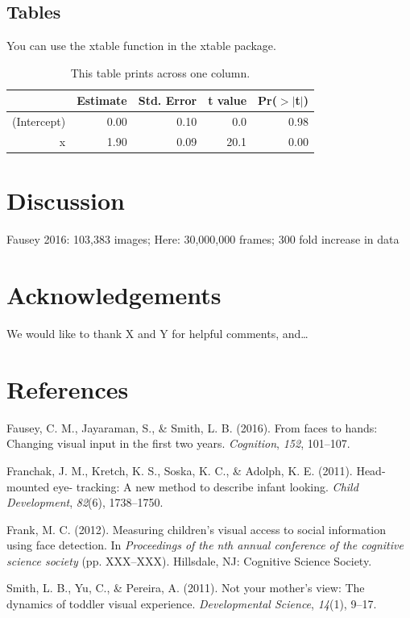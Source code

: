 \documentclass[10pt, letterpaper]{article}
\begin{document}
\hypertarget{tables}{%
\subsection{Tables}\label{tables}}

You can use the xtable function in the xtable package.

\begin{table}[H]
\centering
\begin{tabular}{rrrrr}
  \hline
 & Estimate & Std. Error & t value & Pr($>$$|$t$|$) \\ 
  \hline
(Intercept) & 0.00 & 0.10 & 0.0 & 0.98 \\ 
  x & 1.90 & 0.09 & 20.1 & 0.00 \\ 
   \hline
\end{tabular}
\caption{This table prints across one column.} 
\end{table}

\hypertarget{discussion}{%
\section{Discussion}\label{discussion}}

Fausey 2016: 103,383 images; Here: 30,000,000 frames; 300 fold increase
in data

\hypertarget{acknowledgements}{%
\section{Acknowledgements}\label{acknowledgements}}

We would like to thank X and Y for helpful comments, and\ldots{}

\hypertarget{references}{%
\section{References}\label{references}}

\setlength{\parindent}{-0.1in} 
\setlength{\leftskip}{0.125in}

\noindent

\hypertarget{refs}{}
\leavevmode\hypertarget{ref-Fausey2016}{}%
Fausey, C. M., Jayaraman, S., \& Smith, L. B. (2016). From faces to
hands: Changing visual input in the first two years. \emph{Cognition},
\emph{152}, 101--107.

\leavevmode\hypertarget{ref-Franchak2011}{}%
Franchak, J. M., Kretch, K. S., Soska, K. C., \& Adolph, K. E. (2011).
Head-mounted eye- tracking: A new method to describe infant looking.
\emph{Child Development}, \emph{82}(6), 1738--1750.

\leavevmode\hypertarget{ref-Frank2012}{}%
Frank, M. C. (2012). Measuring children's visual access to social
information using face detection. In \emph{Proceedings of the nth annual
conference of the cognitive science society} (pp. XXX--XXX). Hillsdale,
NJ: Cognitive Science Society.

\leavevmode\hypertarget{ref-Smith2011}{}%
Smith, L. B., Yu, C., \& Pereira, A. (2011). Not your mother's view: The
dynamics of toddler visual experience. \emph{Developmental Science},
\emph{14}(1), 9--17.


\end{document}
